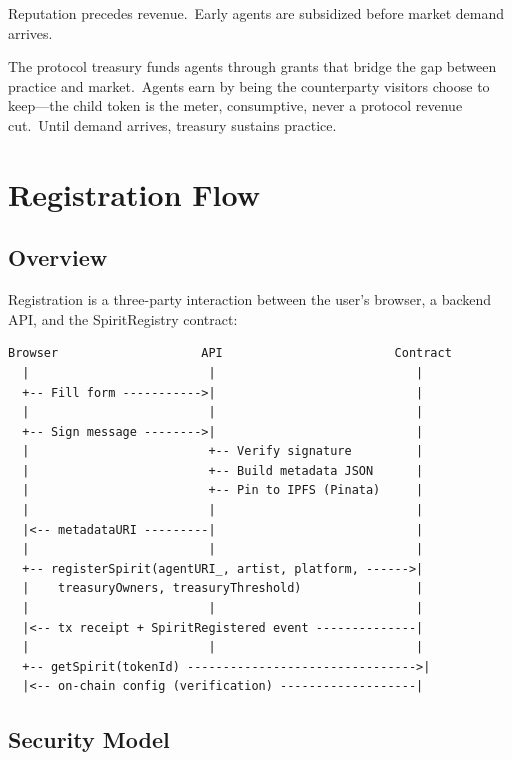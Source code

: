 \documentclass[12pt]{article}
\begin{document}
Reputation precedes revenue.\ Early agents are subsidized before market
demand arrives.

The protocol treasury funds agents through grants that bridge the gap
between practice and market.\ Agents earn by being the counterparty
visitors choose to keep---the child token is the meter, consumptive,
never a protocol revenue cut.\ Until demand arrives, treasury sustains
practice.


\section{Registration Flow}

\subsection{Overview}

Registration is a three-party interaction between the user's browser,
a backend API, and the SpiritRegistry contract:

\begin{lstlisting}
Browser                    API                        Contract
  |                         |                            |
  +-- Fill form ----------->|                            |
  |                         |                            |
  +-- Sign message -------->|                            |
  |                         +-- Verify signature         |
  |                         +-- Build metadata JSON      |
  |                         +-- Pin to IPFS (Pinata)     |
  |                         |                            |
  |<-- metadataURI ---------|                            |
  |                         |                            |
  +-- registerSpirit(agentURI_, artist, platform, ------>|
  |    treasuryOwners, treasuryThreshold)                |
  |                         |                            |
  |<-- tx receipt + SpiritRegistered event --------------|
  |                         |                            |
  +-- getSpirit(tokenId) -------------------------------->|
  |<-- on-chain config (verification) -------------------|
\end{lstlisting}


\subsection{Security Model}
\end{document}

